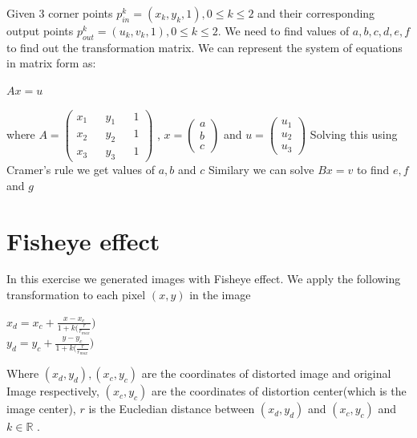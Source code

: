\documentclass[paper=a4, fontsize=11pt]{scrartcl} %
\numberwithin{equation}{section} %
\numberwithin{figure}{section} %
\numberwithin{table}{section} %
\begin{document}
Given 3 corner points \(p_{in}^k = (x_k,y_k,1), 0 \leq k \leq 2\) and their corresponding output points \(p_{out}^k = (u_k,v_k,1), 0 \leq k \leq 2\). We need to find values of \(a,b,c,d,e,f\) to find out the transformation matrix. We can represent the system of equations in matrix form as:

\(Ax = u\)

where \( A =
        \begin{pmatrix}
          x_1 && y_1 && 1\\
          x_2 && y_2 && 1\\
          x_3 && y_3 && 1  
        \end{pmatrix}
      \) , \(x = \begin{pmatrix} a\\ b\\ c \end{pmatrix}\) and \(u = \begin{pmatrix} u_1\\ u_2\\ u_3 \end{pmatrix}\)
Solving this using Cramer's rule we get values of \(a, b\) and \(c\)
Similary we can solve
\(Bx = v\) to find \(e,f\) and \(g\)


\section{Fisheye effect}

In this exercise we generated images with Fisheye effect. We apply the following transformation to each pixel \((x,y)\) in the image

\(x_d = x_c + \frac{x - x_c}{1 + k(\frac{r}{r_{max}}}) \)\\
\(y_d = y_c + \frac{y - y_c}{1 + k(\frac{r}{r_{max}}}) \)

Where \((x_d, y_d), (x_c, y_c)\) are the coordinates of distorted image and original Image respectively, \((x_c,y_c)\) are the coordinates of distortion center(which is the image center), \(r\) is the Eucledian distance between \((x_d, y_d)\) and \((x_c, y_c)\) and \(k \in \mathbb{R}\) .
\end{document}
